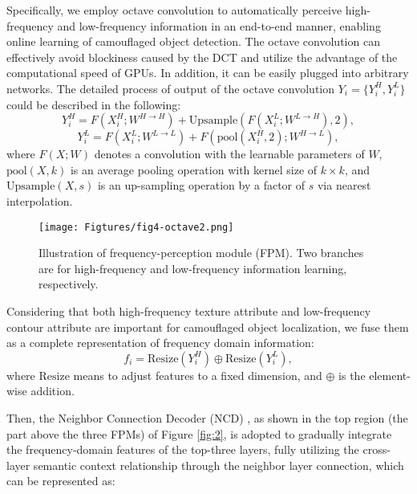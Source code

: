\documentclass[sigconf,screen]{acmart}
\begin{document}
Specifically, we employ octave convolution \cite{r40} to automatically perceive high-frequency and low-frequency information in an end-to-end manner, enabling online learning of camouflaged object detection. The octave convolution can effectively avoid blockiness caused by the DCT and utilize the advantage of the computational speed of GPUs. In addition, 
it can be easily plugged into arbitrary networks. 
The detailed process of output of the octave convolution \(Y_i=\{Y_i^H,Y_i^L\}\) could be described in the following:  
\begin{equation}
    Y_i^H=F(X_i^H;W^{H\rightarrow H})+\mathrm{Upsample}(F(X_i^L;W^{L\rightarrow H}),2),
    \label{eq1}
\end{equation}
\begin{equation}
    Y_i^L=F(X_i^L;W^{L\rightarrow L})+F(\mathrm{pool}(X_i^H,2);W^{H\rightarrow L}),
    \label{eq2}
\end{equation}
where \(F(X;W)\) denotes a convolution with the learnable parameters of \(W\), \(\mathrm{pool}(X, k)\) is an average pooling operation with kernel size of $k \times k$, and \(\mathrm{Upsample}(X, s)\) is an up-sampling operation by a factor of \(s\) via nearest interpolation.

\begin{figure}[!t]
\centering
\texttt{[image: Figtures/fig4-octave2.png]}
\caption{Illustration of frequency-perception module (FPM). Two branches are for high-frequency and low-frequency information learning, respectively. }
\label{fig:4}
\end{figure}


Considering that both high-frequency texture attribute and low-frequency contour attribute are important for camouflaged object localization, we fuse them as a complete representation of frequency domain information:
\begin{equation}
    f_i= \mathrm{Resize}(Y_i^H) \oplus \mathrm{Resize}(Y_i^L),
    \label{eq2-2}
\end{equation}
where $\mathrm{Resize}$ means to adjust features to a fixed dimension, and $\oplus$ is the element-wise addition.


Then, the Neighbor Connection Decoder (NCD) \cite{r53}, as shown in the top region (the part above the three FPMs) of Figure \ref{fig:2}, is adopted to gradually integrate the frequency-domain features of the top-three layers, fully utilizing the cross-layer semantic context relationship through the neighbor layer connection, which can be represented as:
\end{document}
